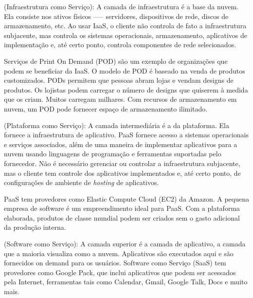 \begin{itemise}
     (Infraestrutura como Serviço): A
    camada de infraestrutura é a base da nuvem. Ela consiste nos ativos físicos —--
    servidores, dispositivos de rede, discos de armazenamento, etc. Ao usar IaaS,
    o cliente não controla de fato a infraestrutura subjacente, mas controla os
    sistemas operacionais, armazenamento, aplicativos de implementação e, até certo
    ponto, controla componentes de rede selecionados. 
    
    Serviços de Print On Demand (POD) são um exemplo de organizações que podem se
    beneficiar da IaaS. O modelo de POD é baseado na venda de produtos customizados.
    PODs permitem que pessoas abram lojas e vendam designs de produtos. Os lojistas
    podem carregar o número de designs que quiserem à medida que os criam. Muitos
    carregam milhares. Com recursos de armazenamento em nuvem, um POD pode fornecer
    espaço de armazenamento ilimitado.
    
     (Plataforma como Serviço): A camada
    intermediária é a da plataforma. Ela fornece a infraestrutura de aplicativo.
    PaaS fornece acesso a sistemas operacionais e serviços associados, além de uma
    maneira de implementar aplicativos para a nuvem usando linguagens de programação
    e ferramentas suportadas pelo fornecedor. Não é necessário gerenciar ou
    controlar a infraestrutura subjacente, mas o cliente tem controle dos
    aplicativos implementados e, até certo ponto, de configurações de ambiente de
    \emph{hosting} de aplicativos. 
    
    PaaS tem provedores como Elastic Compute Cloud (EC2) da Amazon. A pequena 
empresa de software é um empreendimento ideal para PaaS. Com a plataforma elaborada,
produtos de classe mundial podem ser criados sem o gasto adicional da produção
interna.
    
     (Software como Serviço): A camada
    superior é a camada de aplicativo, a camada que a maioria visualiza como a
    nuvem. Aplicativos são executados aqui e são fornecidos on demand para os
    usuários. Software como Serviço (SaaS) tem provedores como Google Pack, que
    inclui aplicativos que podem ser acessados pela Internet, ferramentas tais como
    Calendar, Gmail, Google Talk, Docs e muito mais.
\end{itemise}

